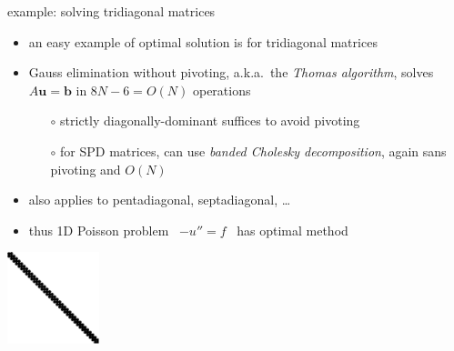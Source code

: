 \documentclass[hide notes,intlimits,usenames,dvipsnames]{beamer}
\newcommand{\bb}{\mathbf{b}}
\newcommand{\bu}{\mathbf{u}}
\begin{document}
\begin{frame}{example: solving tridiagonal matrices}
\begin{itemize}
\item an easy example of optimal solution is for tridiagonal matrices
\item Gauss elimination without pivoting, a.k.a.~the \emph{Thomas algorithm}, solves $A \bu = \bb$ in $8N-6=O(N)$ operations
	\begin{itemize}
	\item[$\circ$] strictly diagonally-dominant suffices to avoid pivoting
    \item[$\circ$] for SPD matrices, can use \emph{banded Cholesky decomposition}, again sans pivoting and $O(N)$
	\end{itemize}
\item also applies to pentadiagonal, septadiagonal, \dots
\item thus 1D Poisson problem \, $-u''=f$ \, has optimal method 
\end{itemize}

\bigskip
\begin{center}
\includegraphics[width=0.2\textwidth]{figs/spytri}
\end{center}
\end{frame}
\end{document}

